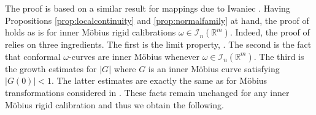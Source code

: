 \documentclass[a4paper,leqno,11pt]{amsart}
\numberwithin{equation}{section}
\theoremstyle{remark}
\theoremstyle{remark}
\newcommand{\R}{\mathbb{R}}
\begin{document}
The proof is based on a similar result for mappings due to Iwaniec \cite{Iwa:87}. Having Propositions \ref{prop:localcontinuity} and \ref{prop:normalfamily} at hand, the proof of  holds as is for inner Möbius rigid calibrations $\omega \in \mathcal{I}_{n}( \R^m )$. Indeed, the proof of  relies on three ingredients. The first is the limit property, . The second is the fact that conformal $\omega$-curves are inner Möbius whenever $\omega \in \mathcal{I}_{n}( \R^m )$. The third is the growth estimates for $|G|$ where $G$ is an inner Möbius curve satisfying $|G(0)| < 1$. The latter estimates are exactly the same as for Möbius transformations considered in \cite{Iwa:87}. These facts remain unchanged for any inner Möbius rigid calibration and thus we obtain the following.
\end{document}
